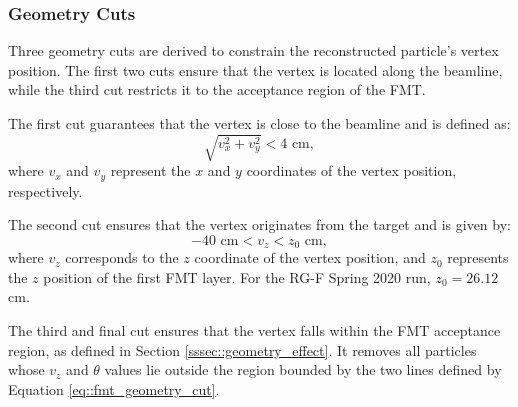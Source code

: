 \subsubsection{Geometry Cuts}
\label{sssec::geometry_cuts}
    Three geometry cuts are derived to constrain the reconstructed particle's vertex position.
    The first two cuts ensure that the vertex is located along the beamline, while the third cut restricts it to the acceptance region of the FMT.

    The first cut guarantees that the vertex is close to the beamline and is defined as:
    \begin{equation*}
        \sqrt{v_x^2 + v_y^2} < 4 \text{ cm},
    \end{equation*}
    where $v_x$ and $v_y$ represent the $x$ and $y$ coordinates of the vertex position, respectively.

    The second cut ensures that the vertex originates from the target and is given by:
    \begin{equation*}
        -40 \text{ cm} < v_z < z_0 \text{ cm},
    \end{equation*}
    where $v_z$ corresponds to the $z$ coordinate of the vertex position, and $z_0$ represents the $z$ position of the first FMT layer.
    For the RG-F Spring 2020 run, $z_0 = 26.12$ cm.

    The third and final cut ensures that the vertex falls within the FMT acceptance region, as defined in Section \ref{sssec::geometry_effect}.
    It removes all particles whose $v_z$ and $\theta$ values lie outside the region bounded by the two lines defined by Equation \eqref{eq::fmt_geometry_cut}.
